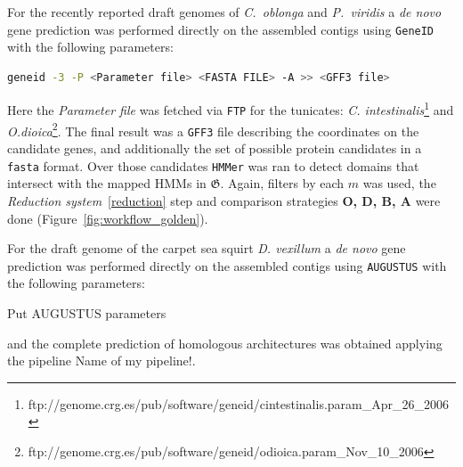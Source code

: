 \documentclass[11pt]{article}
\newcommand{\TODO}[1]{\begingroup\color{red}#1\endgroup}
\begin{document}
For the recently reported draft genomes of \textit{C.\ oblonga} and 
\textit{P.\ viridis} a \textit{de novo} gene prediction was performed 
directly on the assembled contigs using \texttt{GeneID}\cite{Blanco:2007} 
with the following parameters:

\begin{lstlisting}[language=bash, breaklines=true]
geneid -3 -P <Parameter file> <FASTA FILE> -A >> <GFF3 file>
\end{lstlisting}

Here the \textit{Parameter file} was fetched via \texttt{FTP} for the tunicates: \textsl{C. intestinalis}\footnote{ftp://genome.crg.es/pub/software/geneid/cintestinalis.param\_Apr\_26\_2006} and 
\textsl{O.dioica}\footnote{ftp://genome.crg.es/pub/software/geneid/odioica.param\_Nov\_10\_2006}.
The final result was a \texttt{GFF3} file describing the coordinates on the 
candidate genes, and additionally the set of possible protein candidates in a 
\texttt{fasta} format. Over those candidates \texttt{HMMer} was ran to detect 
domains that intersect with the mapped HMMs in $\boldsymbol{\mathfrak{G}}$. 
Again, filters by each $m$ was used, the \textsl{Reduction 
system}~\ref{reduction} step and comparison strategies \textbf{O, D, B, A} were 
done (Figure~\ref{fig:workflow_golden}).

For the draft genome of the carpet sea squirt \textit{D. vexillum} 
\cite{velandia2016a} a \textit{de novo} gene prediction was performed 
directly on the assembled contigs using \texttt{AUGUSTUS} \cite{augustus} 
with the following parameters:

\TODO{Put AUGUSTUS parameters}

and the complete prediction of homologous architectures was obtained applying 
the pipeline \TODO{Name of my pipeline!}.
\end{document}
